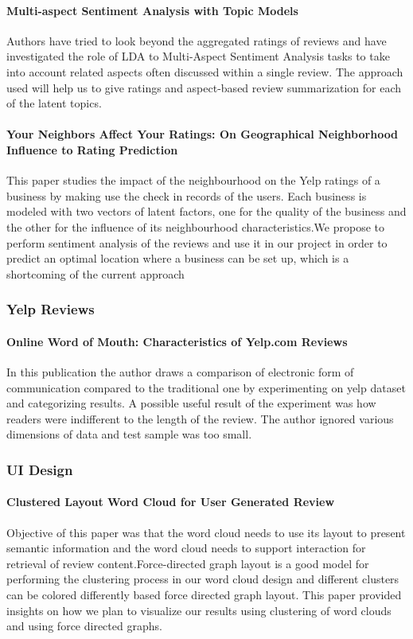 \documentclass[12pt]{article} %
\begin{document}
\paragraph{Multi-aspect Sentiment Analysis with Topic Models}
Authors have tried to look beyond the aggregated ratings of reviews and have investigated the role of LDA to Multi-Aspect Sentiment Analysis tasks to take into account related aspects often discussed within a single review. The approach used will help us to give ratings and aspect-based review summarization for each of the latent topics.

\paragraph{Your Neighbors Affect Your Ratings: On Geographical Neighborhood Influence to Rating Prediction}
This paper studies the impact of the neighbourhood on the Yelp ratings of a business by making use the check in records of the users. Each business is modeled with two vectors of latent factors, one for the quality of the business and the other for the influence of its neighbourhood characteristics.We propose to perform sentiment analysis of the reviews and use it in our project in order to predict an optimal location where a business can be set up, which is a shortcoming of the current approach

\subsubsection{Yelp Reviews}

\paragraph{Online Word of Mouth: Characteristics of Yelp.com Reviews}
In this publication the author draws a comparison of electronic form of communication compared to the traditional one by experimenting on yelp dataset and categorizing results. A possible useful result of the experiment was how readers were indifferent to the length of the review. The author ignored various dimensions of data and test sample was too small.

\subsubsection{UI Design}

\paragraph{Clustered Layout Word Cloud for User Generated Review}
Objective of this paper was that the word cloud needs to use its layout to present semantic information and the word cloud needs to support interaction for retrieval of review content.Force-directed graph layout is a good model for performing the clustering process in our word cloud design and different clusters can be colored differently based force directed graph layout. This paper provided insights on how we plan to visualize our results using clustering of word clouds and using force directed graphs.
\end{document}

